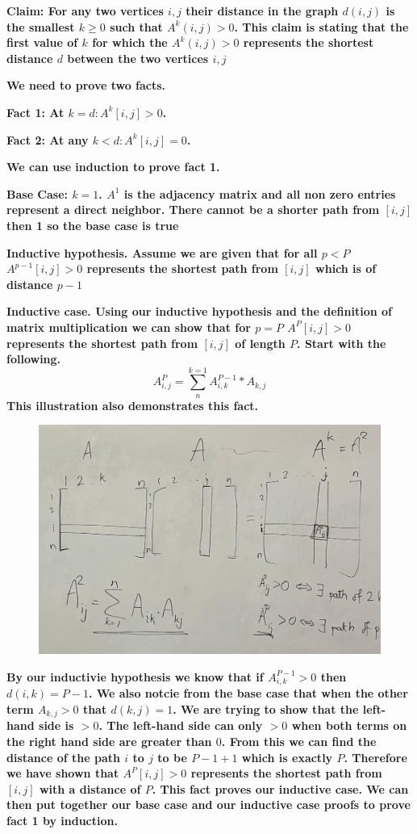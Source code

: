 \documentclass[addpoints]{exam}
\begin{document}
\begin{questions}
\begin{parts}
\textbf{Claim: For any two vertices $i,j$ their distance in the graph $d(i,j)$ is the smallest $k \ge 0$ such that $A^k(i,j) > 0$. This claim is stating that the first value of $k$ for which the $A^k(i,j) > 0$ represents the shortest distance $d$ between the two vertices $i,j$}

\textbf{We need to prove two facts.}

\textbf{Fact 1: At $k=d: A^k[i,j] > 0$.}

\textbf{Fact 2: At any $k<d: A^k[i,j] = 0$.}

\textbf{We can use induction to prove fact 1.}

\textbf{Base Case: $k=1$. $A^1$ is the adjacency matrix and all non zero entries represent a direct neighbor. There cannot be a shorter path from $[i,j]$ then 1 so the base case is true}

\textbf{Inductive hypothesis. Assume we are given that for all $p < P$ $A^{p-1}[i,j] > 0$ represents the shortest path from $[i,j]$ which is of distance $p-1$}

\textbf{Inductive case. Using our inductive hypothesis and the definition of matrix multiplication we can show that for $p = P$ $A^{P}[i,j] > 0$ represents the shortest path from $[i,j]$ of length $P$. Start with the following.}
\[
A^{P}_{i,j} = \sum_{n}^{k=1} A^{P-1}_{i,k} * A_{k,j}
\]
\textbf{This illustration also demonstrates this fact.}

\begin{figure}[H]
    \centering
    \includegraphics[width=0.5\linewidth]{Matrix Multiplication.jpg}
\end{figure}

\textbf{By our inductivie hypothesis we know that if $A^{P-1}_{i,k} > 0$ then $d(i,k) = P - 1$. We also notcie from the base case that when the other term $A_{k,j} > 0$ that $d(k,j) = 1$. We are trying to show that the left-hand side is $>0$. The left-hand side can only $ > 0$ when both terms on the right hand side are greater than $0$. From this we can find the distance of the path $i$ to $j$ to be $P-1 + 1$ which is exactly $P$. Therefore we have shown that $A^P[i,j] > 0$ represents the shortest path from $[i,j]$ with a distance of $P$. This fact proves our inductive case. We can then put together our base case and our inductive case proofs to prove fact 1 by induction.}


\end{parts}
\end{questions}
\end{document}
